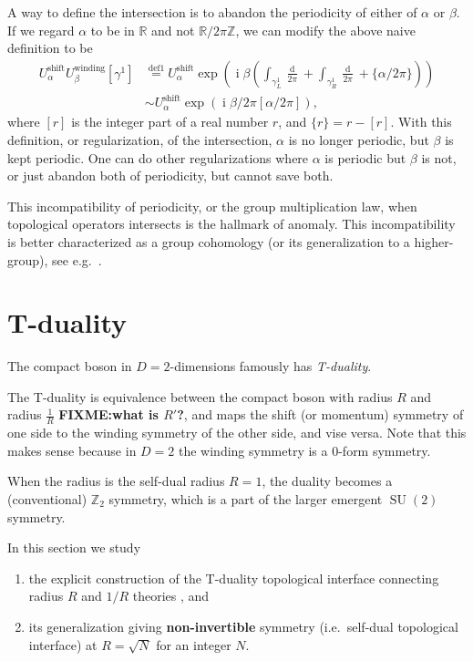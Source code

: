 \documentclass[
  letterpaper,
  DIV=11,
  numbers=noendperiod]{scrreport}
\providecommand{\tightlist}{%
  \setlength{\itemsep}{0pt}\setlength{\parskip}{0pt}}\usepackage{longtable,booktabs,array}
\DeclareMathOperator{\SU}{SU}
\DeclareMathOperator{\imunit}{i}
\newcommand{\stdim}{D}
\begin{document}
A way to define the intersection is to abandon the periodicity of either
of \(\alpha\) or \(\beta\). If we regard \(\alpha\) to be in
\(\mathbb{R}\) and not \(\mathbb{R}/2\pi\mathbb{Z}\), we can modify the
above naive definition to be \[
\begin{aligned}
U^\text{shift}_\alpha U^\text{winding}_\beta[\gamma^1] &\stackrel{\text{def1}}{=} U^\text{shift}_\alpha \exp\left(\imunit\beta \left(\int_{\gamma^1_L}\frac{\mathop{d\phi_L}}{2\pi} + \int_{\gamma^1_R}\frac{\mathop{d\phi_R}}{2\pi} + \{\alpha/2\pi\}\right)\right)\\
& \sim U^\text{shift}_\alpha \exp\left(\imunit\beta/2\pi [\alpha/2\pi] \right),
\end{aligned}
\] where \([r]\) is the integer part of a real number \(r\), and
\(\{r\}= r-[r]\). With this definition, or regularization, of the
intersection, \(\alpha\) is no longer periodic, but \(\beta\) is kept
periodic. One can do other regularizations where \(\alpha\) is periodic
but \(\beta\) is not, or just abandon both of periodicity, but cannot
save both.

This incompatibility of periodicity, or the group multiplication law,
when topological operators intersects is the hallmark of anomaly. This
incompatibility is better characterized as a group cohomology (or its
generalization to a higher-group), see e.g.~\textcite{TachikawaTasi}.

\hypertarget{t-duality}{%
\section{T-duality}\label{t-duality}}

The compact boson in \(\stdim=2\)-dimensions famously has
\emph{T-duality}.

The T-duality is equivalence between the compact boson with radius \(R\)
and radius \(\frac{1}{R}\) \textbf{FIXME:what is \(R'\)?}, and maps the
shift (or momentum) symmetry of one side to the winding symmetry of the
other side, and vise versa. Note that this makes sense because in
\(\stdim=2\) the winding symmetry is a 0-form symmetry.

When the radius is the self-dual radius \(R=1\), the duality becomes a
(conventional) \(\mathbb{Z}_2\) symmetry, which is a part of the larger
emergent \(\SU(2)\) symmetry.

In this section we study

\begin{enumerate}
\def\labelenumi{\arabic{enumi}.}
\tightlist
\item
  the explicit construction of the T-duality topological interface
  connecting radius \(R\) and \(1/R\) theories
  \autocite{Kapustin:2009av}, and
\item
  its generalization giving \textbf{non-invertible} symmetry
  (i.e.~self-dual topological interface) at \(R=\sqrt{N}\) for an
  integer \(N\).
\end{enumerate}
\end{document}
